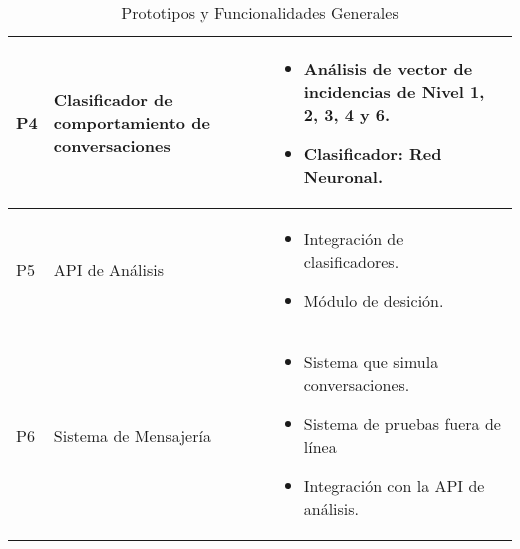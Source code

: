 \begin{table}[h]
\begin{center}
\begin{tabular}{|l|p{45mm}|p{80mm}|}
P4 & Clasificador de comportamiento de conversaciones & \begin{itemize}
\item An\'alisis de vector de incidencias de Nivel 1, 2, 3, 4 y 6.
\item Clasificador: Red Neuronal.
\end{itemize} \\

\hline 

P5 & API de An\'alisis & \begin{itemize}
\item Integraci\'on de clasificadores.
\item M\'odulo de desici\'on.
\end{itemize} \\

\hline 

P6 & Sistema de Mensajer\'ia & \begin{itemize}
\item Sistema que simula conversaciones.
\item Sistema de pruebas fuera de l\'inea
\item Integraci\'on con la API de an\'alisis. 
\end{itemize} \\

\hline 


\end{tabular}
\caption{Prototipos y Funcionalidades Generales}
\label{tablaprototipos}

\end{center}

\end{table}